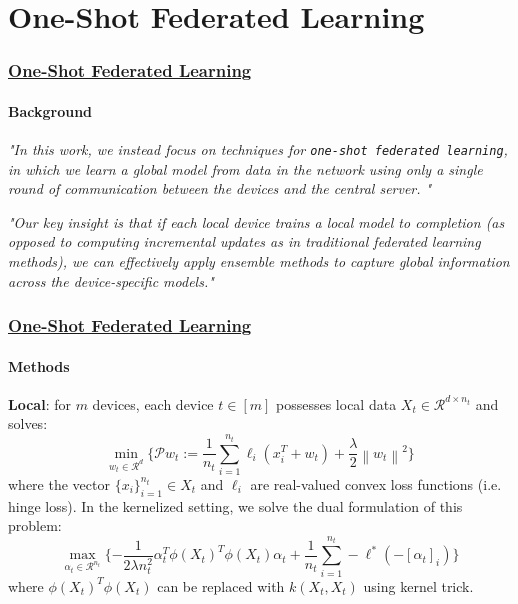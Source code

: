 \documentclass[10pt]{beamer}
\begin{document}
    \section*{One-Shot Federated Learning}
    \begin{frame}
        \frametitle{
            \href{https://arxiv.org/pdf/1902.11175.pdf}{
                One-Shot Federated Learning
            }
        }
        
        \framesubtitle{
            Background
        }

        \textit{"In this work, we instead focus on techniques for \texttt{one-shot federated learning}, in which we learn a global model from data in the network using only a single round of communication between the devices and the central server. "}

        \textit{"Our key insight is that if each local device trains a local model to completion (as opposed to computing incremental updates as in traditional federated learning methods), we can effectively apply ensemble methods to capture global information across the device-specific models."}
        

    \end{frame}

    \begin{frame}
        \frametitle{
            \href{https://arxiv.org/pdf/1902.11175.pdf}{
                One-Shot Federated Learning
            }
        }
        
        \framesubtitle{
            Methods
        }

        \textbf{Local}: for $ m $ devices, each device $ t \in [m] $ possesses local data $ X_t \in \mathcal{R}^{d \times n_t} $ and solves:
        $$
            \min_{w_t \in \mathcal{R}^d}\lbrace{ \mathcal{P}{w_t} := \frac{1}{n_t} \sum_{i=1}^{n_t} \ell_i(x_i^T + w_t) + \frac{\lambda}{2} \left\|w_t\right\|^2 }\rbrace
        $$
        where the vector $ \{x_i\}^{n_t}_{i=1} \in X_t $ and $ \ell_i $ 
        are real-valued convex loss functions (i.e. hinge loss). In the kernelized setting, we solve the dual formulation of this problem:
        $$
            \max_{\alpha_t \in \mathcal{R}^{n_t}} 
            \lbrace{
                -\frac{1}{2\lambda n^2_t} 
                \alpha^T_t \phi (X_t)^T \phi (X_t) 
                \alpha_t + \frac{1}{n_t} 
                \sum^{n_t}_{i=1} - \ell^* (-[\alpha_t]_i)
            }\rbrace
        $$
        where $ \phi (X_t)^T \phi (X_t) $ can be replaced with $ k(X_t, X_t) $ using kernel trick.
    \end{frame} 
    
\end{document}
